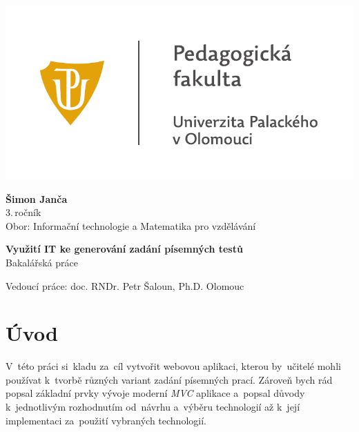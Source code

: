\documentclass[14pt,a4paper]{article}
\begin{document}
	\begin{titlepage}
		\begin{center}
            {
            \centering
            \includegraphics[]{./PDF_tisk/UP_logo_PdF-UP_horizont_cz.pdf}
            }
			
			\vspace{3cm}

            {
                \LARGE
                \textbf{Šimon Janča}\\
                3.\,ročník\\[8mm]
                Obor: Informační technologie a Matematika pro vzdělávání
            }

            \vspace{4cm}
			
			{
			    \textbf{\Huge Využití IT ke generování zadání písemných testů}\\[4mm]
			    \Large
			    Bakalářská práce
			}

            \vfill
            
            {
                Vedoucí práce:
                doc. RNDr. Petr Šaloun, Ph.D.
                \hfill
    			Olomouc \the\year{}
            }
			
		\end{center}
	\end{titlepage}
	\tableofcontents
	
	\newpage
	
	\section{Úvod}
    V~této práci si~kladu za~cíl vytvořit webovou aplikaci, kterou by~učitelé mohli používat k~tvorbě různých variant zadání písemných prací.
    Zároveň bych rád popsal základní prvky vývoje moderní \emph{MVC} aplikace a~popsal důvody k~jednotlivým rozhodnutím od~návrhu
    a~výběru technologií až k~její implementaci za~použití vybraných technologií.
    
\end{document}
